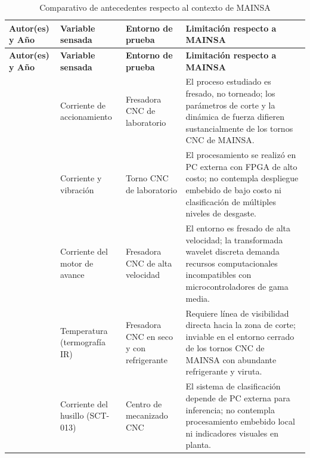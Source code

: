 {\setlength{\parskip}{1.5pt}
\begin{longtable}{|>{\raggedright\arraybackslash}p{3.0cm}|>{\raggedright\arraybackslash}p{2.6cm}|>{\raggedright\arraybackslash}p{2.6cm}|>{\raggedright\arraybackslash}p{4.4cm}|}
\caption{Comparativo de antecedentes respecto al contexto de MAINSA}
\label{tab:comparativo_antecedentes}
\\
\hline
\textbf{Autor(es) y Año} & \textbf{Variable sensada} & \textbf{Entorno de prueba} & \textbf{Limitación respecto a MAINSA} \\
\hline \hline
\endfirsthead

\hline
\textbf{Autor(es) y Año} & \textbf{Variable sensada} & \textbf{Entorno de prueba} & \textbf{Limitación respecto a MAINSA} \\
\hline \hline
\endhead

\hline
\endfoot

\hline
\multicolumn{4}{c}{\rule{0pt}{3ex}\textbf{Fuente:} Elaboración propia, 2026.}
\endlastfoot

\cite{romero2003} & Corriente de accionamiento & Fresadora CNC de laboratorio & El proceso estudiado es fresado, no torneado; los parámetros de corte y la dinámica de fuerza difieren sustancialmente de los tornos CNC de MAINSA. \\ \hline

\cite{trejo2010} & Corriente y vibración & Torno CNC de laboratorio & El procesamiento se realizó en PC externa con FPGA de alto costo; no contempla despliegue embebido de bajo costo ni clasificación de múltiples niveles de desgaste. \\ \hline

\cite{sevilla2011} & Corriente del motor de avance & Fresadora CNC de alta velocidad & El entorno es fresado de alta velocidad; la transformada wavelet discreta demanda recursos computacionales incompatibles con microcontroladores de gama media. \\ \hline

\cite{ramirez2018} & Temperatura (termografía IR) & Fresadora CNC en seco y con refrigerante & Requiere línea de visibilidad directa hacia la zona de corte; inviable en el entorno cerrado de los tornos CNC de MAINSA con abundante refrigerante y viruta. \\ \hline

\cite{lai2025} & Corriente del husillo (SCT-013) & Centro de mecanizado CNC & El sistema de clasificación depende de PC externa para inferencia; no contempla procesamiento embebido local ni indicadores visuales en planta. \\ \hline


\end{longtable}}
